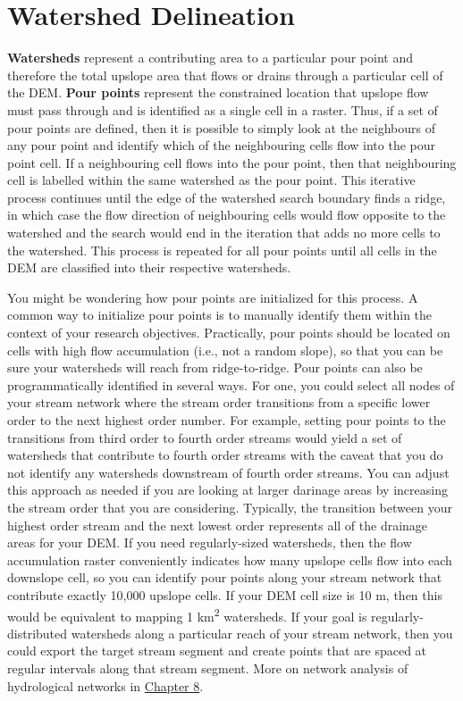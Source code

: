 \documentclass[
]{book}
\begin{document}
\hypertarget{watershed-delineation}{%
\section{Watershed Delineation}\label{watershed-delineation}}

\textbf{Watersheds} represent a contributing area to a particular pour point and therefore the total upslope area that flows or drains through a particular cell of the DEM. \textbf{Pour points} represent the constrained location that upslope flow must pass through and is identified as a single cell in a raster. Thus, if a set of pour points are defined, then it is possible to simply look at the neighbours of any pour point and identify which of the neighbouring cells flow into the pour point cell. If a neighbouring cell flows into the pour point, then that neighbouring cell is labelled within the same watershed as the pour point. This iterative process continues until the edge of the watershed search boundary finds a ridge, in which case the flow direction of neighbouring cells would flow opposite to the watershed and the search would end in the iteration that adds no more cells to the watershed. This process is repeated for all pour points until all cells in the DEM are classified into their respective watersheds.

You might be wondering how pour points are initialized for this process. A common way to initialize pour points is to manually identify them within the context of your research objectives. Practically, pour points should be located on cells with high flow accumulation (i.e., not a random slope), so that you can be sure your watersheds will reach from ridge-to-ridge. Pour points can also be programmatically identified in several ways. For one, you could select all nodes of your stream network where the stream order transitions from a specific lower order to the next highest order number. For example, setting pour points to the transitions from third order to fourth order streams would yield a set of watersheds that contribute to fourth order streams with the caveat that you do not identify any watersheds downstream of fourth order streams. You can adjust this approach as needed if you are looking at larger darinage areas by increasing the stream order that you are considering. Typically, the transition between your highest order stream and the next lowest order represents all of the drainage areas for your DEM. If you need regularly-sized watersheds, then the flow accumulation raster conveniently indicates how many upslope cells flow into each downslope cell, so you can identify pour points along your stream network that contribute exactly 10,000 upslope cells. If your DEM cell size is 10 m, then this would be equivalent to mapping 1 km\textsuperscript{2} watersheds. If your goal is regularly-distributed watersheds along a particular reach of your stream network, then you could export the target stream segment and create points that are spaced at regular intervals along that stream segment. More on network analysis of hydrological networks in \href{https://ubc-geomatics-textbook.github.io/geomatics-textbook/network-analysis.html}{Chapter 8}.
\end{document}
